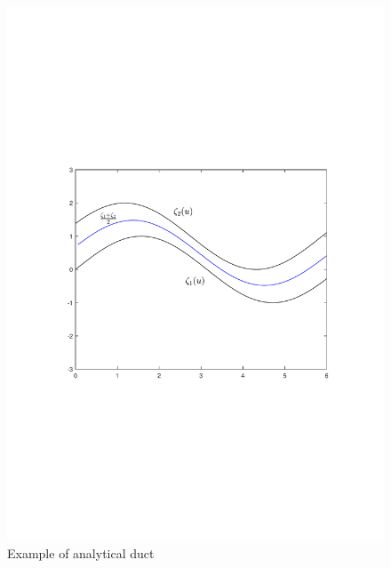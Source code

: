 \documentclass[11pt,a4paper]{article}
\begin{document}
\begin{figure}[h]
\centering
\includegraphics[scale=0.75]{figures/fig11.pdf}
\caption{ Example of analytical duct \label{fig:analyticduct}}
\end{figure}
\end{document}
